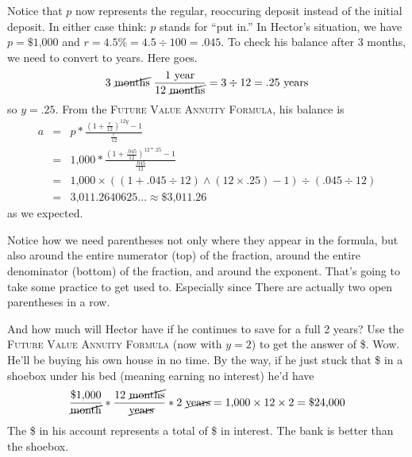 Notice that $p$ now represents the regular, reoccuring deposit instead of the initial deposit.  In either case think:  $p$ stands for ``put in.''  In Hector's situation, we have $p=\$\text{1,000}$ and $r=4.5\% =4.5 \div 100 =.045$.  To check his balance after 3 months, we need to convert to years.  Here goes. 
 $$3 \text{ \cancel{months} }  \frac{1 \text{ year}}{12 \text{ \cancel{months}}} =3 \div 12= .25 \text{ years}$$
 so $y = .25$.   From the  \textsc{Future Value Annuity Formula}, his balance is
\begin{eqnarray*}
a & = &  p \ast \frac{\left( 1 + \frac{r}{12}\right) ^{12y}-1}{\frac{r}{12}}\\
& = &    \text{1,000} \ast \frac{\left( 1 + \frac{.045}{12}\right) ^{12\ast.25}-1}{\frac{.045}{12}}\\
& =  &  \text{1,000} \times (( 1 + .045 \div 12) \wedge (12 \times .25)-1) \div (.045 \div 12)\\
& =  & \text{3,011.2640625}\ldots  \approx \$\text{3,011.26}
\end{eqnarray*}
as we expected.

Notice how we need parentheses not only where they appear in the formula, but also around the entire numerator (top) of the fraction, around the entire denominator (bottom) of the fraction, and around the exponent.  That's going to take some practice to get used to.  Especially since There are actually two open parentheses in a row. 

And how much will Hector have if he continues to save for a full 2 years?  Use the   \textsc{Future Value Annuity Formula} (now with $y=2$) to get the answer of \$.
Wow.  He'll be buying his own house in no time.  By the way, if he just stuck that \$ in a shoebox under his bed (meaning earning no interest) he'd have 
$$\frac{\$\text{1,000}}{\cancel{\text{month}}} \ast \frac{12 \text{ \cancel{months}}}{\text{ \cancel{years}}} \ast 2 \text{ \cancel{years}}= \text{1,000} \times 12 \times 2 = \$\text{24,000}$$
The \$ in his account represents a total of \$ in interest.  The bank is better than the shoebox.

